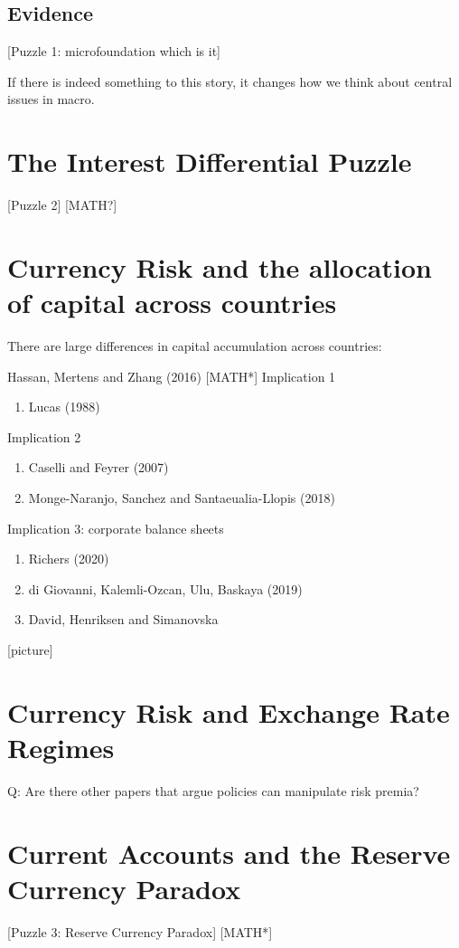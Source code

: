 \documentclass[12pt,letter]{article}
\theoremstyle{break} \theorembodyfont{\normalfont\itshape}
\theoremstyle{break}
\theoremstyle{break} \theorembodyfont{\normalfont\itshape}
\theoremstyle{break} \theorembodyfont{\normalfont\itshape}
\begin{document}
\subsection{Evidence}

[Puzzle 1: microfoundation which is it]

If there is indeed something to this story, it changes how we think
about central issues in macro.



\section{The Interest Differential Puzzle}

[Puzzle 2]
[MATH?]

\section{Currency Risk and the allocation of capital across countries}
There are large differences in capital accumulation across countries:

Hassan, Mertens and Zhang (2016)
[MATH*]
Implication 1
\begin{enumerate}
\item Lucas (1988)
\end{enumerate}
Implication 2
\begin{enumerate}
\item Caselli and Feyrer (2007)
\item Monge-Naranjo, Sanchez and Santaeualia-Llopis (2018)
\end{enumerate}
Implication 3: corporate balance sheets
\begin{enumerate}
\item Richers (2020)
\item di Giovanni, Kalemli-Ozcan, Ulu, Baskaya (2019)
\item David, Henriksen and Simanovska
\end{enumerate} [picture]
\section{Currency Risk and Exchange Rate Regimes}
Q: Are there other papers that argue policies can manipulate risk
premia?

\section{Current Accounts and the Reserve Currency Paradox}
 [Puzzle 3: Reserve Currency Paradox]
 [MATH*]
\end{document}
